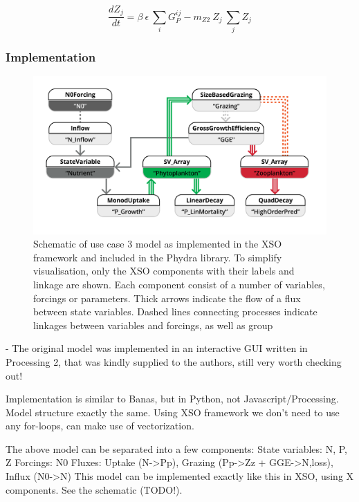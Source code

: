 \documentclass[journal abbreviation, manuscript]{copernicus}
\begin{document}
\begin{equation}
    \frac{d Z_j}{d t} =
    \beta \ \epsilon \ \sum_{i} G_P^{ij} %
    - m_{Z2} \ Z_j \ \sum_{j} Z_j  %
\end{equation}




\subsubsection{Implementation}
\begin{figure}[t]
\includegraphics[width=15cm]{Figures/firstdraft_schematics/code_schematics/ASTroCAT.pdf}
\caption{Schematic of use case 3 model as implemented in the XSO framework and included in the Phydra library. To simplify visualisation, only the XSO components with their labels and linkage are shown. Each component consist of a number of variables, forcings or parameters. Thick arrows indicate the flow of a flux between state variables. Dashed lines connecting processes indicate linkages between variables and forcings, as well as group}
\label{Figure:CodeSchematics_3}
\end{figure}

- The original model was implemented in an interactive GUI written in Processing 2, that was kindly supplied to the authors, still very worth checking out!

Implementation is similar to Banas, but in Python, not Javascript/Processing. Model structure exactly the same.
Using XSO framework we don't need to use any for-loops, can make use of vectorization.

The above model can be separated into a few components:
State variables: N, P, Z
Forcings: N0
Fluxes: Uptake (N->Pp), Grazing (Pp->Zz + GGE->N,loss), Influx (N0->N)
This model can be implemented exactly like this in XSO, using X components. See the schematic (TODO!).
\end{document}

